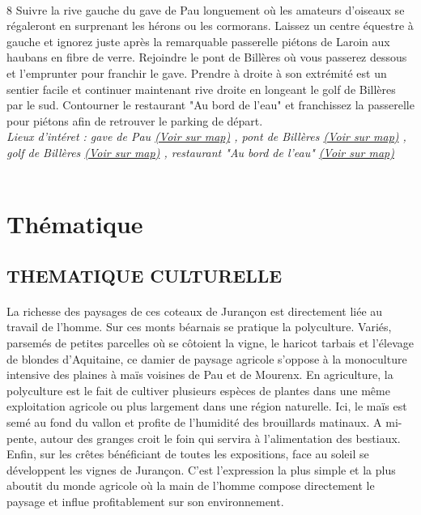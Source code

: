\documentclass{article}
\begin{document}
        \paragraph{}
        8
                        Suivre la rive gauche du gave de Pau longuement où les amateurs d'oiseaux se régaleront en surprenant les hérons ou les cormorans. Laissez un centre équestre à gauche et ignorez juste après la remarquable passerelle piétons de Laroin aux haubans en fibre de verre. Rejoindre le pont de Billères où vous passerez dessous et l'emprunter pour franchir le gave. Prendre à droite à son extrémité est un sentier facile et continuer maintenant rive droite en longeant le golf de Billères par le sud. Contourner le restaurant "Au bord de l'eau" et franchissez la passerelle pour piétons afin de retrouver le parking de départ.
                    \\
        \emph{Lieux d'intéret : gave de
                            Pau 
        \href{https://www.google.com/maps/?q=43.287530, -0.391115}{(Voir sur map)}
        , pont de
                            Billères 
        \href{https://www.google.com/maps/?q=43.287530, -0.391115}{(Voir sur map)}
        , golf de
                            Billères 
        \href{https://www.google.com/maps/?q=43.287530, -0.391115}{(Voir sur map)}
        , restaurant "Au bord de
                            l'eau" 
        \href{https://www.google.com/maps/?q=43.287530, -0.391115}{(Voir sur map)}
        }\\~\\

        \section{Thématique}
        
        \subsection{THEMATIQUE CULTURELLE}
    
        \paragraph{}
        La richesse des paysages de ces coteaux de Jurançon est directement liée au travail de l'homme. Sur ces monts béarnais se pratique la polyculture. Variés, parsemés de petites parcelles où se côtoient la vigne, le haricot tarbais et l'élevage de blondes d'Aquitaine, ce damier de paysage agricole s'oppose à la monoculture intensive des plaines à maïs voisines de Pau et de Mourenx. En agriculture, la polyculture est le fait de cultiver plusieurs espèces de plantes dans une même exploitation agricole ou plus largement dans une région naturelle. Ici, le maïs est semé au fond du vallon et profite de l'humidité des brouillards matinaux. A mi-pente, autour des granges croit le foin qui servira à l'alimentation des bestiaux. Enfin, sur les crêtes bénéficiant de toutes les expositions, face au soleil se développent les vignes de Jurançon. C'est l'expression la plus simple et la plus aboutit du monde agricole où la main de l'homme compose directement le paysage et influe profitablement sur son environnement.
\end{document}
